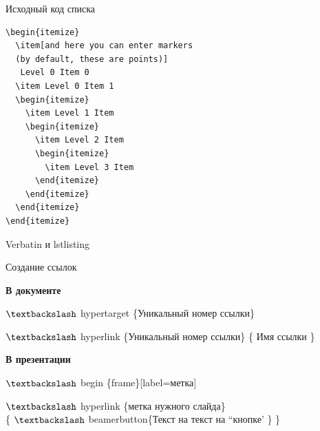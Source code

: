 \documentclass{beamer}[aspectratio=169]
\begin{document}
\begin{frame}[fragile,label=list]{Исходный код списка}
\begin{adjustbox}{scale=0.7}
\begin{large}
\transwipe

\lstset{extendedchars=\true} %

 \begin{lstlisting}[language=Tex]
 \begin{itemize}
  \item[and here you can enter markers
  (by default, these are points)]
   Level 0 Item 0 
  \item Level 0 Item 1 
  \begin{itemize}
    \item Level 1 Item
    \begin{itemize}
      \item Level 2 Item
      \begin{itemize}
        \item Level 3 Item
      \end{itemize}
    \end{itemize}
  \end{itemize}
\end{itemize}
\end{lstlisting}
\end{large}
\end{adjustbox}
\hyperlink{frame_A}{}
\end{frame}

\begin{frame}{Verbatin и lstlisting}

\end{frame}




\begin{frame}[label=list]{Создание ссылок}

\begin{center}
{\LARGE \textbf{В документе}}
\end{center}

$\textbackslash$ hypertarget \{Уникальный номер ссылки\} 

$\textbackslash$ hyperlink \{Уникальный номер ссылки\} \{ Имя ссылки \}

\begin{center}
{\LARGE \textbf{В презентации}}
\end{center}
$\textbackslash$ begin \{frame\}[label=метка]

$\textbackslash$ hyperlink \{метка нужного слайда\} \\ \{ $\textbackslash$ beamerbutton\{Текст на текст на ``кнопке' \} \}
\end{frame}
\end{document}
